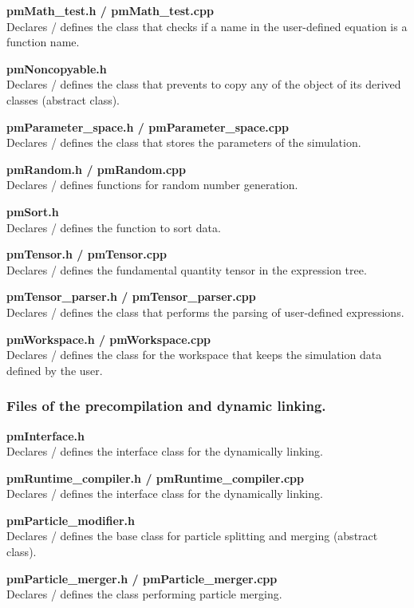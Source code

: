 \documentclass[a4paper,12pt,openany]{book}
\theoremstyle{break}
\begin{document}
\textbf{pmMath\_test.h / pmMath\_test.cpp} \\
Declares / defines the class that checks if a name in the user-defined equation is a function name.

\textbf{pmNoncopyable.h} \\
Declares / defines the class that prevents to copy any of the object of its derived classes (abstract class).

\textbf{pmParameter\_space.h / pmParameter\_space.cpp} \\
Declares / defines the class that stores the parameters of the simulation.

\textbf{pmRandom.h / pmRandom.cpp} \\
Declares / defines functions for random number generation.

\textbf{pmSort.h} \\
Declares / defines the function to sort data.

\textbf{pmTensor.h / pmTensor.cpp} \\
Declares / defines the fundamental quantity tensor in the expression tree.

\textbf{pmTensor\_parser.h / pmTensor\_parser.cpp} \\
Declares / defines the class that performs the parsing of user-defined expressions.

\textbf{pmWorkspace.h / pmWorkspace.cpp} \\
Declares / defines the class for the workspace that keeps the simulation data defined by the user.

\subsubsection{Files of the precompilation and dynamic linking.}

\textbf{pmInterface.h} \\
Declares / defines the interface class for the dynamically linking.

\textbf{pmRuntime\_compiler.h / pmRuntime\_compiler.cpp} \\
Declares / defines the interface class for the dynamically linking.

\textbf{pmParticle\_modifier.h} \\
Declares / defines the base class for particle splitting and merging (abstract class).

\textbf{pmParticle\_merger.h / pmParticle\_merger.cpp} \\
Declares / defines the class performing particle merging.
\end{document}
